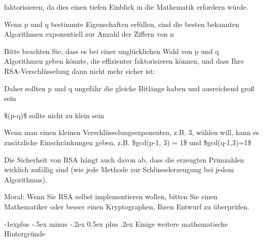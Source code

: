 \documentclass[a4paper]{article}
\makeatletter
\renewcommand{\subsection}{\@startsection{subsection}{2}{0mm}%
 {-1explus -.5ex minus -.2ex}%
 {0.5ex plus .2ex}%
 {\normalfont\normalsize\bfseries}}
\makeatother
\begin{document}
\begin{multicols}{3}
\begin{itemize*}
            faktorisieren, da dies einen tiefen Einblick in die Mathematik
            erfordern würde.
            \begin{itemize*}
                  \item Wenn p und q bestimmte Eigenschaften erfüllen, sind die besten bekannten Algorithmen exponentiell zur Anzahl der Ziffern von n
                  \item Bitte beachten Sie, dass es bei einer unglücklichen Wahl von p und q Algorithmen geben könnte, die effizienter faktorisieren können, und dass Ihre RSA-Verschlüsselung dann nicht mehr sicher ist:
                  \begin{itemize*} \item Daher sollten p und q ungefähr die gleiche Bitlänge haben und ausreichend groß sein \item \$(p-q)\$ sollte nicht zu klein sein \item Wenn man einen kleinen Verschlüsselungsexponenten, z.B. 3, wählen will, kann es zusätzliche Einschränkungen geben, z.B. \$gcd(p-1, 3) = 1\$ und \$gcd(q-1,3)=1\$ \end{itemize*}
                  \item Die Sicherheit von RSA hängt auch davon ab, dass die erzeugten Primzahlen wirklich zufällig sind (wie jede Methode zur Schlüsselerzeugung bei jedem Algorithmus).
                  \item Moral: Wenn Sie RSA selbst implementieren wollen, bitten Sie einen Mathematiker oder besser einen Kryptographen, Ihren Entwurf zu überprüfen.
            \end{itemize*}
      \end{itemize*}


      \subsection{Einige weitere mathematische
            Hintergründe}


\end{multicols}
\end{document}
